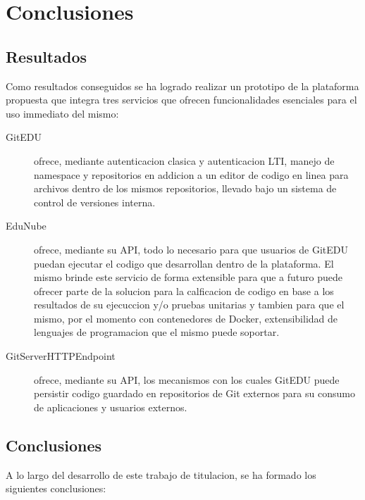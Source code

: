 
\chapter{Conclusiones}
\label{capitulo7}

\section{Resultados}
Como resultados conseguidos se ha logrado realizar un prototipo de la plataforma propuesta que integra tres servicios que ofrecen funcionalidades esenciales para el uso immediato del mismo:
\begin{description}
	\item[GitEDU] ofrece, mediante autenticacion clasica y autenticacion LTI, manejo de namespace y repositorios en addicion a un editor de codigo en linea para archivos dentro de los mismos repositorios, llevado bajo un sistema de control de versiones interna.
    \item[EduNube] ofrece, mediante su API, todo lo necesario para que usuarios de GitEDU puedan ejecutar el codigo que desarrollan dentro de la plataforma. El mismo brinde este servicio de forma extensible para que a futuro puede ofrecer parte de la solucion para la calficacion de codigo en base a los resultados de su ejecuccion y/o pruebas unitarias y tambien para que el mismo, por el momento con contenedores de Docker, extensibilidad de lenguajes de programacion que el mismo puede soportar.
    \item[GitServerHTTPEndpoint] ofrece, mediante su API, los mecanismos con los cuales GitEDU puede persistir codigo guardado en repositorios de Git externos para su consumo de aplicaciones y usuarios externos.
\end{description}


\section{Conclusiones}
A lo largo del desarrollo de este trabajo de titulacion, se ha formado los siguientes conclusiones:

